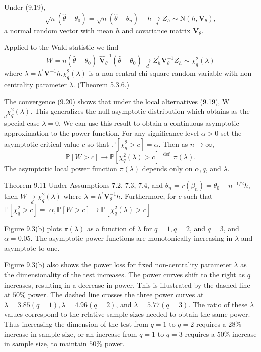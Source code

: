 \documentclass[10pt]{article}
\begin{document}
Under (9.19),
$$
\sqrt{n}\left(\widehat{\theta}-\theta_{0}\right)=\sqrt{n}\left(\widehat{\theta}-\theta_{n}\right)+h \underset{d}{\longrightarrow} Z_{h} \sim \mathrm{N}\left(h, \boldsymbol{V}_{\theta}\right),
$$
a normal random vector with mean $h$ and covariance matrix $\boldsymbol{V}_{\theta}$.

Applied to the Wald statistic we find
$$
W=n\left(\widehat{\theta}-\theta_{0}\right)^{\prime} \widehat{\boldsymbol{V}}_{\theta}^{-1}\left(\widehat{\theta}-\theta_{0}\right) \underset{d}{\longrightarrow} Z_{h}^{\prime} \boldsymbol{V}_{\theta}^{-1} Z_{h} \sim \chi_{q}^{2}(\lambda)
$$
where $\lambda=h^{\prime} \boldsymbol{V}^{-1} h . \chi_{q}^{2}(\lambda)$ is a non-central chi-square random variable with non-centrality parameter $\lambda$. (Theorem 5.3.6.)

The convergence (9.20) shows that under the local alternatives (9.19), W $\underset{d}{ } \chi_{q}^{2}(\lambda)$. This generalizes the null asymptotic distribution which obtains as the special case $\lambda=0$. We can use this result to obtain a continuous asymptotic approximation to the power function. For any significance level $\alpha>0$ set the asymptotic critical value $c$ so that $\mathbb{P}\left[\chi_{q}^{2}>c\right]=\alpha$. Then as $n \rightarrow \infty$,
$$
\mathbb{P}[W>c] \longrightarrow \mathbb{P}\left[\chi_{q}^{2}(\lambda)>c\right] \stackrel{\text { def }}{=} \pi(\lambda) .
$$
The asymptotic local power function $\pi(\lambda)$ depends only on $\alpha, q$, and $\lambda$.

Theorem 9.11 Under Assumptions 7.2, 7.3, 7.4, and $\theta_{n}=r\left(\beta_{n}\right)=\theta_{0}+n^{-1 / 2} h$, then $W \underset{d}{\longrightarrow} \chi_{q}^{2}(\lambda)$ where $\lambda=h^{\prime} \boldsymbol{V}_{\theta}^{-1} h$. Furthermore, for $c$ such that $\mathbb{P}\left[\chi_{q}^{2}>c\right]=$ $\alpha, \mathbb{P}[W>c] \longrightarrow \mathbb{P}\left[\chi_{q}^{2}(\lambda)>c\right]$

Figure 9.3(b) plots $\pi(\lambda)$ as a function of $\lambda$ for $q=1, q=2$, and $q=3$, and $\alpha=0.05$. The asymptotic power functions are monotonically increasing in $\lambda$ and asymptote to one.

Figure 9.3(b) also shows the power loss for fixed non-centrality parameter $\lambda$ as the dimensionality of the test increases. The power curves shift to the right as $q$ increases, resulting in a decrease in power. This is illustrated by the dashed line at $50 \%$ power. The dashed line crosses the three power curves at $\lambda=3.85(q=1), \lambda=4.96(q=2)$, and $\lambda=5.77(q=3)$. The ratio of these $\lambda$ values correspond to the relative sample sizes needed to obtain the same power. Thus increasing the dimension of the test from $q=1$ to $q=2$ requires a $28 \%$ increase in sample size, or an increase from $q=1$ to $q=3$ requires a $50 \%$ increase in sample size, to maintain $50 \%$ power.
\end{document}
